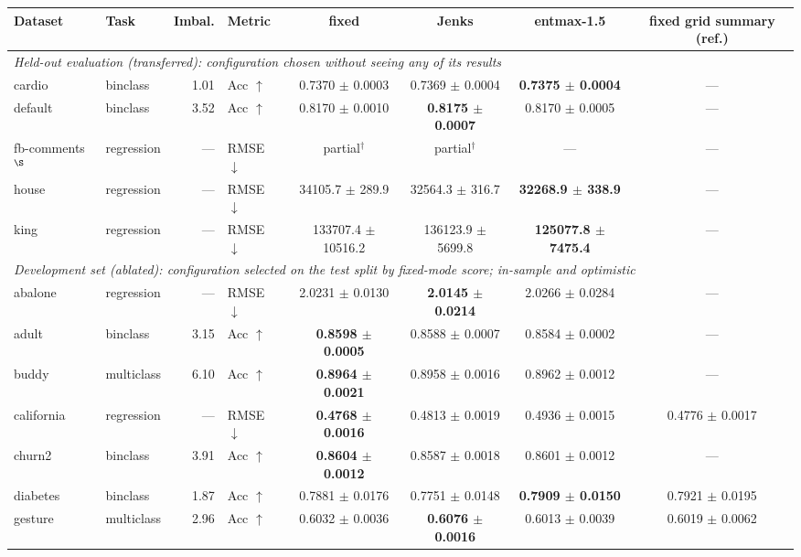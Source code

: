 \begin{table}[t]
\centering\small
\begin{tabular}{llrlcccc}
\toprule
Dataset & Task & Imbal. & Metric & fixed & Jenks & entmax-1.5 & fixed grid summary (ref.) \\
\midrule
\multicolumn{8}{l}{\textit{Held-out evaluation (transferred): configuration chosen without seeing any of its results}} \\
cardio & binclass & 1.01 & Acc $\uparrow$ & 0.7370 $\pm$ 0.0003 & 0.7369 $\pm$ 0.0004 & \textbf{0.7375 $\pm$ 0.0004} & --- \\
default & binclass & 3.52 & Acc $\uparrow$ & 0.8170 $\pm$ 0.0010 & \textbf{0.8175 $\pm$ 0.0007} & 0.8170 $\pm$ 0.0005 & --- \\
fb-comments$^\S$ & regression & — & RMSE $\downarrow$ & partial$^\dagger$ & partial$^\dagger$ & --- & --- \\
house & regression & — & RMSE $\downarrow$ & 34105.7 $\pm$ 289.9 & 32564.3 $\pm$ 316.7 & \textbf{32268.9 $\pm$ 338.9} & --- \\
king & regression & — & RMSE $\downarrow$ & 133707.4 $\pm$ 10516.2 & 136123.9 $\pm$ 5699.8 & \textbf{125077.8 $\pm$ 7475.4} & --- \\
\midrule
\multicolumn{8}{l}{\textit{Development set (ablated): configuration selected on the test split by fixed-mode score; in-sample and optimistic}} \\
abalone & regression & — & RMSE $\downarrow$ & 2.0231 $\pm$ 0.0130 & \textbf{2.0145 $\pm$ 0.0214} & 2.0266 $\pm$ 0.0284 & --- \\
adult & binclass & 3.15 & Acc $\uparrow$ & \textbf{0.8598 $\pm$ 0.0005} & 0.8588 $\pm$ 0.0007 & 0.8584 $\pm$ 0.0002 & --- \\
buddy & multiclass & 6.10 & Acc $\uparrow$ & \textbf{0.8964 $\pm$ 0.0021} & 0.8958 $\pm$ 0.0016 & 0.8962 $\pm$ 0.0012 & --- \\
california & regression & — & RMSE $\downarrow$ & \textbf{0.4768 $\pm$ 0.0016} & 0.4813 $\pm$ 0.0019 & 0.4936 $\pm$ 0.0015 & 0.4776 $\pm$ 0.0017 \\
churn2 & binclass & 3.91 & Acc $\uparrow$ & \textbf{0.8604 $\pm$ 0.0012} & 0.8587 $\pm$ 0.0018 & 0.8601 $\pm$ 0.0012 & --- \\
diabetes & binclass & 1.87 & Acc $\uparrow$ & 0.7881 $\pm$ 0.0176 & 0.7751 $\pm$ 0.0148 & \textbf{0.7909 $\pm$ 0.0150} & 0.7921 $\pm$ 0.0195 \\
gesture & multiclass & 2.96 & Acc $\uparrow$ & 0.6032 $\pm$ 0.0036 & \textbf{0.6076 $\pm$ 0.0016} & 0.6013 $\pm$ 0.0039 & 0.6019 $\pm$ 0.0062 \\

\end{tabular}
\end{table}
